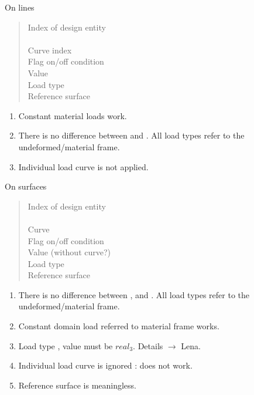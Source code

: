On lines
\begin{quote}
 \cnl \chs Index of design entity\\
\cod{-} \cnl\\
 \cnl \chs Curve index\\
 \cnl \chs Flag on/off condition \\
 \cnl \chs Value\\
 \cnl \chs Load type\\
 \chs Reference surface
\end{quote}
\begin{enumerate}
\item Constant material loads work.
\item There is no difference between  and . All load types
refer to the undeformed/material frame.
\item Individual load curve is not applied.
\end{enumerate}

On surfaces
\begin{quote}
 \cnl \chs Index of design entity\\
\cod{-} \cnl\\
 \chs Curve\\
 \cnl \chs Flag on/off condition \\
 \cnl \chs Value (without curve?)\\
 \cnl \chs Load type\\
 \chs Reference surface
\end{quote}
\begin{enumerate}
\item  There is no difference between ,  and
  . All load types refer to the undeformed/material
  frame. 
\item Constant domain load referred to material frame works.
\item Load type , value must be $real_3$. Details
  $\to$ Lena. 
\item Individual load curve is ignored : does not work.
\item Reference surface is meaningless.
\end{enumerate}

